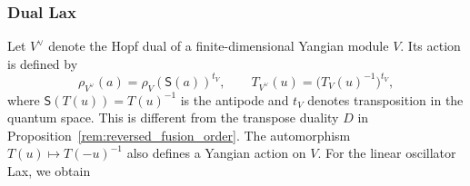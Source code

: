 \documentclass[12pt,reqno]{amsart}
\numberwithin{equation}{section}
\begin{document}
\subsubsection{Dual Lax}
Let $V^\vee$ denote the Hopf dual of a finite-dimensional Yangian
module $V$. Its action is defined by
\begin{equation*}
    \rho_{V^\vee}(a)=\rho_V(\mathsf S(a))^{t_V},
    \qquad
    T_{V^\vee}(u)=\bigl(T_V(u)^{-1}\bigr)^{t_V},
\end{equation*}
where $\mathsf S(T(u))=T(u)^{-1}$ is the antipode and $t_V$
denotes transposition in the quantum space. This is different
from the transpose duality $D$ in
Proposition~\ref{rem:reversed_fusion_order}.
The automorphism $T(u)\mapsto T(-u)^{-1}$
\cite[Section~1]{NT1998} also defines a Yangian action on $V$.
For the linear oscillator Lax, we obtain
\end{document}
